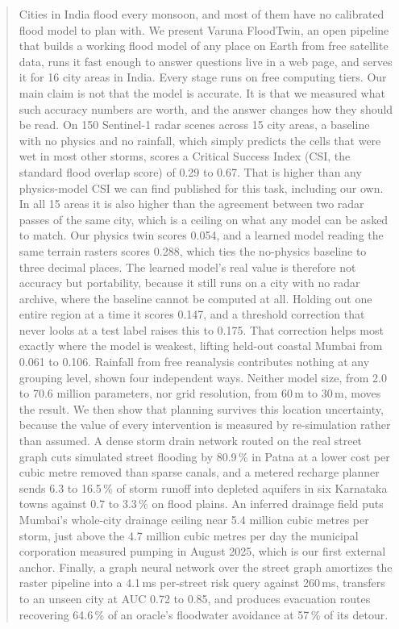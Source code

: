 \documentclass[journal]{IEEEtran}
\begin{document}
\begin{abstract}
Cities in India flood every monsoon, and most of them have no calibrated flood model to plan with.
We present Varuna FloodTwin, an open pipeline that builds a working flood model of any place on
Earth from free satellite data, runs it fast enough to answer questions live in a web page, and
serves it for 16 city areas in India. Every stage runs on free computing tiers. Our main claim is
not that the model is accurate. It is that we measured what such accuracy numbers are worth, and
the answer changes how they should be read. On 150 Sentinel-1 radar scenes across 15 city areas, a
baseline with no physics and no rainfall, which simply predicts the cells that were wet in most
other storms, scores a Critical Success Index (CSI, the standard flood overlap score) of 0.29 to
0.67. That is higher than any physics-model CSI we can find published for this task, including our
own. In all 15 areas it is also higher than the agreement between two radar passes of the same
city, which is a ceiling on what any model can be asked to match. Our physics twin scores 0.054,
and a learned model reading the same terrain rasters scores 0.288, which ties the no-physics
baseline to three decimal places. The learned model's real value is therefore not accuracy but
portability, because it still runs on a city with no radar archive, where the baseline cannot be
computed at all. Holding out one entire region at a time it scores 0.147, and a threshold
correction that never looks at a test label raises this to 0.175. That correction helps most
exactly where the model is weakest, lifting held-out coastal Mumbai from 0.061 to 0.106. Rainfall
from free reanalysis contributes nothing at any grouping level, shown four independent ways.
Neither model size, from 2.0 to 70.6 million parameters, nor grid resolution, from 60\,m to 30\,m,
moves the result. We then show that planning survives this location uncertainty, because the value
of every intervention is measured by re-simulation rather than assumed. A dense storm drain network
routed on the real street graph cuts simulated street flooding by 80.9\,\% in Patna at a lower cost
per cubic metre removed than sparse canals, and a metered recharge planner sends 6.3 to 16.5\,\% of
storm runoff into depleted aquifers in six Karnataka towns against 0.7 to 3.3\,\% on flood plains.
An inferred drainage field puts Mumbai's whole-city drainage ceiling near 5.4 million cubic metres
per storm, just above the 4.7 million cubic metres per day the municipal corporation measured
pumping in August 2025, which is our first external anchor. Finally, a graph neural network over
the street graph amortizes the raster pipeline into a 4.1\,ms per-street risk query against
260\,ms, transfers to an unseen city at AUC 0.72 to 0.85, and produces evacuation routes recovering
64.6\,\% of an oracle's floodwater avoidance at 57\,\% of its detour.
\end{abstract}
\end{document}
